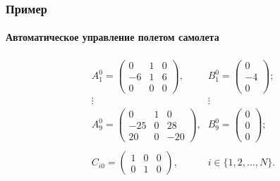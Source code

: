 \documentclass[ignorenonframetext,hyperref={pdftex,unicode},compress,handout]{beamer}
\begin{document}
\begin{frame}
    \frametitle{Пример}
    \framesubtitle{Автоматическое управление полетом самолета}
        \begin{equation*}
            \begin{array}{cc}
                A_1^0 = \left(
                    \begin{array}{ccc}
                        0     &     1     &     0 \\
                        -6    &     1   &     6 \\
                        0  &     0     &     0
                    \end{array}
                \right)\mbox{,} &
                B_1^0 = \left(
                    \begin{array}{c}
                        0 \\
                        -4 \\
                        0
                    \end{array}
                \right)\mbox{;} \\
                \vdots   &   \vdots \\
                A_9^0 = \left(
                    \begin{array}{ccc}
                        0     &     1     &     0 \\
                        -25    &     0   &     28 \\
                        20  &     0     &     -20
                    \end{array}
                \right)\mbox{,} &
                B_9^0 = \left(
                    \begin{array}{c}
                        0 \\
                        0 \\
                        0
                    \end{array}
                \right)\mbox{;} \\ \\
                C_{i0} = \left(
                    \begin{array}{ccc}
                        1 & 0 & 0 \\
                        0 & 1 & 0
                    \end{array}
                \right)\mbox{,} &
                i \in \{1,2,\ldots,N\}\mbox{.}
            \end{array}
        \end{equation*}
\end{frame}
\end{document}
